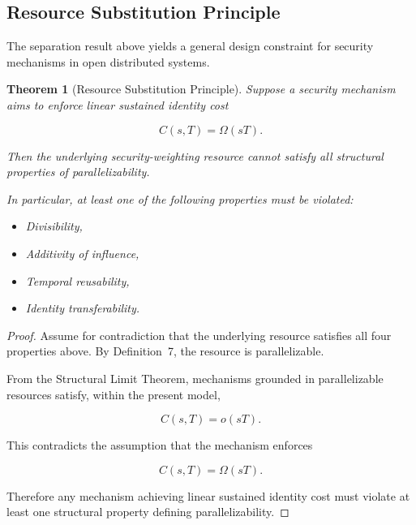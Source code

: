 \documentclass[journal]{IEEEtran}
\newtheorem{theorem}{Theorem}
\begin{document}
	\subsection{Resource Substitution Principle}
	
	The separation result above yields a general
	design constraint for security mechanisms
	in open distributed systems.
	
	\begin{theorem}[Resource Substitution Principle]
		
		Suppose a security mechanism aims to enforce
		linear sustained identity cost
		
		\[
		C(s,T) = \Omega(sT).
		\]
		
		Then the underlying security-weighting resource
		cannot satisfy all structural properties
		of parallelizability.
		
		In particular,
		at least one of the following properties
		must be violated:
		
		\begin{itemize}
			
			\item Divisibility,
			\item Additivity of influence,
			\item Temporal reusability,
			\item Identity transferability.
			
		\end{itemize}
		
	\end{theorem}
	
	\begin{proof}
		
		Assume for contradiction that the underlying
		resource satisfies all four properties above.
		By Definition~7,
		the resource is parallelizable.
		
		From the Structural Limit Theorem,
		mechanisms grounded in parallelizable resources
		satisfy, within the present model,
		
		\[
		C(s,T) = o(sT).
		\]
		
		This contradicts the assumption that the mechanism
		enforces
		
		\[
		C(s,T) = \Omega(sT).
		\]
		
		Therefore any mechanism achieving linear
		sustained identity cost must violate at least
		one structural property defining
		parallelizability.
		
	\end{proof}
	
\end{document}
